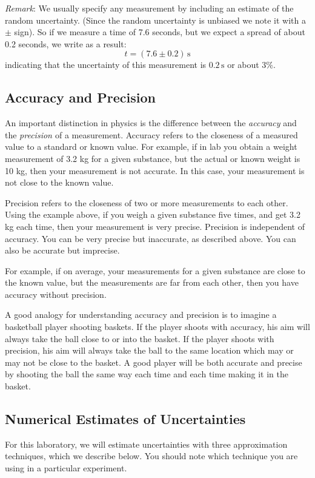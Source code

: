 \emph{Remark}: We usually specify any measurement by including an estimate of the random uncertainty. (Since the random uncertainty is unbiased we note it with a $\pm$ sign). So if we measure a time of 7.6 seconds, but we expect a spread of about 0.2 seconds, we write as a result:
\begin{equation}
    t = (7.6\pm 0.2)\,\mathrm{s}
\end{equation}
indicating that the uncertainty of this measurement is $0.2\,\mathrm{s}$ or about $3\%$. \myskip
\subsection{Accuracy and Precision}
An important distinction in physics is the difference between the {\it{accuracy}} and the {\it{precision }} of a measurement.
Accuracy refers to the closeness of a measured value to a standard or known value. For example, if in lab you obtain a weight measurement of 3.2 kg for a given substance, but the actual or known weight is 10 kg, then your measurement is not accurate. In this case, your measurement is not close to the known value. \myskip

Precision refers to the closeness of two or more measurements to each other. Using the example above, if you weigh a given substance five times, and get 3.2 kg each time, then your measurement is very precise. Precision is independent of accuracy. You can be very precise but inaccurate, as described above. You can also be accurate but imprecise. \myskip

For example, if on average, your measurements for a given substance are close to the known value, but the measurements are far from each other, then you have accuracy without precision. \myskip

A good analogy for understanding accuracy and precision is to imagine a basketball player shooting baskets. If the player shoots with accuracy, his aim will always take the ball close to or into the basket. If the player shoots with precision, his aim will always take the ball to the same location which may or may not be close to the basket. A good player will be both accurate and precise by shooting the ball the same way each time and each time making it in the basket.
\subsection{Numerical Estimates of Uncertainties}

For this laboratory, we will estimate uncertainties with three approximation techniques, which we describe below. You should note which technique you are using in a particular experiment.

